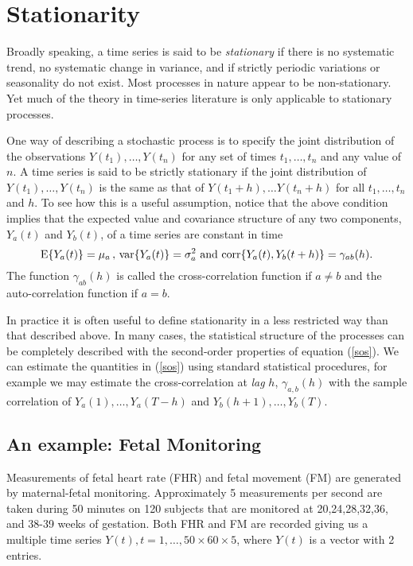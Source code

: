 \section{Stationarity}
Broadly speaking, a time series is said to be {\sl stationary} if
there is no systematic trend, no systematic change in variance,
and if strictly
periodic variations or seasonality do not exist. Most processes in
nature appear to be non-stationary. Yet much of the theory in
time-series literature is only applicable to stationary processes.

One way of describing a stochastic process is to specify the joint
distribution of the observations $Y(t_1), \dots, Y(t_n)$ for any
set of times $t_1, \dots, t_n$ and any value of $n$. A time series
is said to be strictly stationary if the joint distribution of
$Y(t_1), \dots, Y(t_n)$ is the same as that of $Y(t_1 + h), \dots
Y(t_n + h)$ for all $t_1, \dots, t_n$ and $h$. To see how this is
a useful assumption, notice that the above condition implies that
the expected value and covariance structure of any two components,
$Y_a(t)$ and $Y_b(t)$, of a time series are
constant in time
\begin{equation}
\label{sos}
\mbox{E} \{Y_a(t)\} = \mu_a \, , \, \mbox{var} \{Y_a(t)\} = \sigma_a^2 \mbox{ and }
\mbox{corr}\{ Y_a(t), Y_b(t+h) \} = \gamma_{ab}(h).
\end{equation}
The function
$\gamma_{ab}(h)$ is called the cross-correlation function if $a\neq b$
and the auto-correlation function if $a=b$. 

In practice it is often useful to define stationarity in a less
restricted way than that described above. In many cases,
the statistical structure of the processes can be
completely described with the second-order properties of equation
(\ref{sos}). We can estimate the
quantities in (\ref{sos}) using
standard statistical procedures,
for example we may estimate the cross-correlation at {\it lag}
$h$, $\gamma_{a,b}(h)$ with the sample correlation of
$Y_a(1),\dots,Y_a(T-h)$ and $Y_b(h+1),\dots,Y_b(T)$. 



\subsection{An example: Fetal Monitoring}

Measurements of fetal heart rate (FHR) and fetal movement (FM) are
generated by maternal-fetal monitoring.    
Approximately 5 measurements per second are taken during 50 minutes on
120 subjects that are monitored at 20,24,28,32,36,
and 38-39 weeks of 
gestation. Both FHR and FM are recorded giving us a multiple time 
series $Y(t), t=1,\dots,50\times 60\times 5$, where $Y(t)$ is a vector
with 2 entries. 

